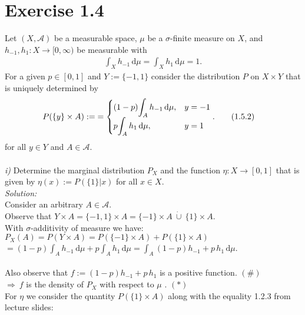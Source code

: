 \documentclass{article}
\begin{document}
\section*{Exercise 1.4}
Let $(X,\mathcal{A})$ be a measurable space, $\mu$ be a $\sigma$-finite measure on $X$, and $h_{-1}, h_1:X \rightarrow [0,\infty)$ be measurable with 
\begin{align*}
\displaystyle{ \int_{X} h_{-1} \, \text{d}\mu = \int_{X} h_{1} \, \text{d}\mu = 1. } \tag{1.5.1}
\end{align*}
For a given $p\in [0,1]$ and $Y:= \{ -1,1 \}$ consider the distribution $P$ on $X \times Y$ that is uniquely determined by 
\begin{align*}
P(\{ y \} \times A) := 
 & = \begin{cases} 
 (1-p)\displaystyle{\int_A h_{-1} \, \text{d}\mu }, & y = -1 \cr  
 p \displaystyle{\int_A h_{1} \, \text{d}\mu }, &y = 1 
\end{cases}. \tag{1.5.2}
\end{align*}
for all $y\in Y$ and $A\in \mathcal{A}$.\\
\\
\textsl{i)} Determine the marginal distribution $P_X$ and the function $\eta:X\rightarrow [0,1]$ that is given by $\eta(x):=P(\{ 1 \}| x)$ for all $x\in X$. \vspace{0.5em}\\
\textsl{Solution:} \\
Consider an arbitrary $A\in\mathcal{A}$. \\
Observe that $Y\times A = \{ -1,1 \} \times A = \{-1\} \times A \ \dot{\cup} \ \{1\} \times A $. \\
With $\sigma$-additivity of measure we have: \\
\indent $P_X(A) = P(Y\times A) =  P( \{-1\} \times A )+P( \{1\} \times A) $ \\
\indent \hspace*{3.1cm}$= \displaystyle{ (1-p)\int_A h_{-1} \,\text{d}\mu + p\int_A h_{1}\, \text{d}\mu = \int_A (1-p)h_{-1}+p\, h_{1}\, \text{d}\mu } $.\\
\vspace*{-1em} \\
Also observe that $f:=(1-p)h_{-1}+p\, h_{1}$ is a positive function. \hspace{4.8cm}$ (\#)$\\
$\Rightarrow \ f$ is the density of $P_X$ with respect to $\mu$ . \hspace{7.6cm}$ (*)$ \\
For $\eta$ we consider the quantity $P(\{ 1\} \times A)$ along with the equality 1.2.3 from lecture slides:\\
\end{document}
